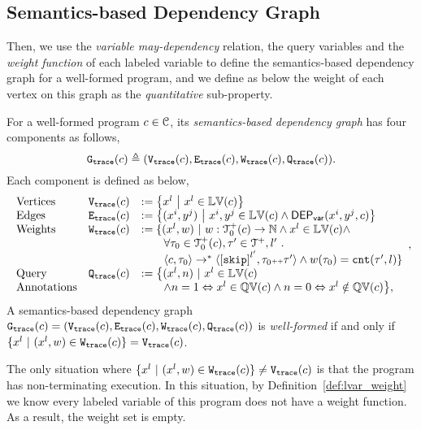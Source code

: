 \subsection{Semantics-based Dependency Graph}
\label{sec:design_choice}
Then, we use the \emph{variable may-dependency} relation, the query variables and the \emph{weight function}
of each labeled variable to 
define the semantics-based dependency graph for a well-formed program,
and we define as below the
weight of each vertex on this graph as the \emph{quantitative} sub-property.
\begin{defn}
\label{def:trace_graph}
For a well-formed program ${c} \in \mathcal{C}$,
its \emph{semantics-based dependency graph} has four components as follows,
\[
 \mathtt{{G_{trace}}}({c}) \triangleq (\mathtt{{V_{trace}}}({c}), \mathtt{{E_{trace}}}({c}), \mathtt{{W_{trace}}}({c}), \mathtt{{Q_{trace}}}({c})).
\]
Each component is defined as below,
{\small
\[
\begin{array}{lll}
 \text{Vertices} &
 \traceV({c}) & := \left\{ 
 x^l
 ~ \middle\vert ~ x^l \in \lvar(c)
 \right\}
 \\
 \text{Edges} &
 \traceE({c}) & := 
 \left\{ 
 (x^i, y^j) 
 ~ \middle\vert ~
 x^i, y^j \in \lvar(c) \land \vardep(x^i, y^j, c) 
 \right\}
 \\
 \text{Weights} &
 \traceW({c}) & := 
 \{ 
 (x^l, w) 
 ~ \vert ~ 
 w : \ftdom_0(c) \to \mathbb{N}
 \land
 x^l \in \lvar(c) \land
 \\ & & \qquad 
 \forall \trace_0 \in \ftdom_0(c), \trace' \in \ftdom, l' \st 
 \\ & & \qquad 
 \config{{c}, \trace_0} \to^{*} 
 \config{\clabel{\eskip}^{l'}, \trace_0 \tracecat \trace'} 
 \land w(\trace_0) = \vcounter(\trace', l) \} 
 \\
 \text{Query} &
 \traceF({c}) & := 
 \big\{(x^l, n) 
 ~ \vert ~ x^l \in \lvar(c) 
 \\ \text{Annotations} & & \qquad
 \land n = 1 \Leftrightarrow x^l \in \qvar(c) \land n = 0 \Leftrightarrow x^l \notin \qvar(c)
 \big\},
\end{array},
\]
}
A semantics-based dependency graph $\mathtt{{G_{trace}}}({c})= (\mathtt{{V_{trace}}}({c}), \mathtt{{E_{trace}}}({c}), \mathtt{{W_{trace}}}({c}), \mathtt{{Q_{trace}}}({c}))$ 
is \emph{well-formed} if and only if $ \{x^l \ |\ (x^l,w)\in \mathtt{{W_{trace}}}({c})\} = \mathtt{{V_{trace}}}({c}) $.
\end{defn}
The only situation where $ \{x^l \ |\ (x^l,w)\in \traceW({c})\} \neq \traceV({c}) $ is that the program
has non-terminating execution.
In this situation, by Definition~\ref{def:lvar_weight}  we know every labeled variable of this program does not have a weight function.
As a result, the weight set is empty.

